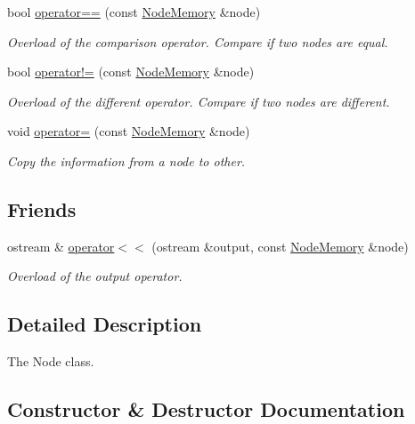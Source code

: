 \begin{DoxyCompactItemize}
bool \hyperlink{classNodeMemory_a24327d9a85343aef4e8b874811180535}{operator==} (const \hyperlink{classNodeMemory}{Node\+Memory} \&node)
\begin{DoxyCompactList}\small\item\em Overload of the comparison operator. Compare if two nodes are equal. \end{DoxyCompactList}\item 
bool \hyperlink{classNodeMemory_a3a21e9b6eec50b63ef1dd3d0bc39ad57}{operator!=} (const \hyperlink{classNodeMemory}{Node\+Memory} \&node)
\begin{DoxyCompactList}\small\item\em Overload of the different operator. Compare if two nodes are different. \end{DoxyCompactList}\item 
void \hyperlink{classNodeMemory_a174c03b58071e654d33be54e6dda2b9b}{operator=} (const \hyperlink{classNodeMemory}{Node\+Memory} \&node)
\begin{DoxyCompactList}\small\item\em Copy the information from a node to other. \end{DoxyCompactList}\end{DoxyCompactItemize}
\subsection*{Friends}
\begin{DoxyCompactItemize}
\item 
ostream \& \hyperlink{classNodeMemory_a175c835cfd52000dbca26c44453707bd}{operator$<$$<$} (ostream \&output, const \hyperlink{classNodeMemory}{Node\+Memory} \&node)
\begin{DoxyCompactList}\small\item\em Overload of the output operator. \end{DoxyCompactList}\end{DoxyCompactItemize}


\subsection{Detailed Description}
The Node class. 

\subsection{Constructor \& Destructor Documentation}
